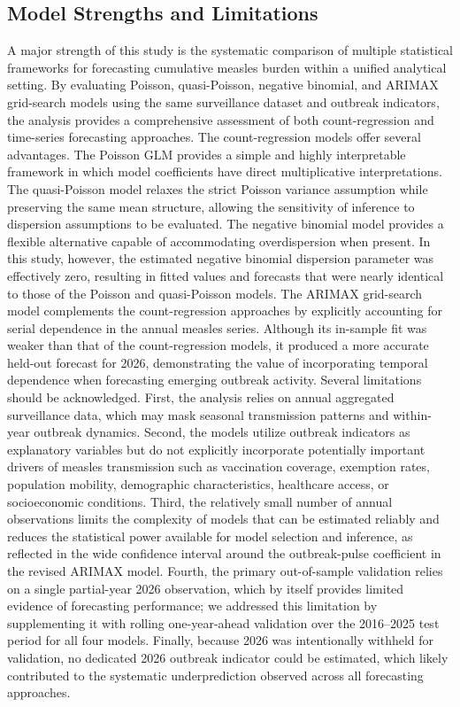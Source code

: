 \documentclass[utf8]{FrontiersinHarvard} %
\begin{document}
\subsection{Model Strengths and Limitations}
A major strength of this study is the systematic comparison of multiple statistical frameworks for forecasting cumulative measles burden within a unified analytical setting. By evaluating Poisson, quasi-Poisson, negative binomial, and ARIMAX grid-search models using the same surveillance dataset and outbreak indicators, the analysis provides a comprehensive assessment of both count-regression and time-series forecasting approaches. The count-regression models offer several advantages. The Poisson GLM provides a simple and highly interpretable framework in which model coefficients have direct multiplicative interpretations. The quasi-Poisson model relaxes the strict Poisson variance assumption while preserving the same mean structure, allowing the sensitivity of inference to dispersion assumptions to be evaluated. The negative binomial model provides a flexible alternative capable of accommodating overdispersion when present. In this study, however, the estimated negative binomial dispersion parameter was effectively zero, resulting in fitted values and forecasts that were nearly identical to those of the Poisson and quasi-Poisson models.
The ARIMAX grid-search model complements the count-regression approaches by explicitly accounting for serial dependence in the annual measles series. Although its in-sample fit was weaker than that of the count-regression models, it produced a more accurate held-out forecast for 2026, demonstrating the value of incorporating temporal dependence when forecasting emerging outbreak activity. Several limitations should be acknowledged. First, the analysis relies on annual aggregated surveillance data, which may mask seasonal transmission patterns and within-year outbreak dynamics. Second, the models utilize outbreak indicators as explanatory variables but do not explicitly incorporate potentially important drivers of measles transmission such as vaccination coverage, exemption rates, population mobility, demographic characteristics, healthcare access, or socioeconomic conditions. Third, the relatively small number of annual observations limits the complexity of models that can be estimated reliably and reduces the statistical power available for model selection and inference, as reflected in the wide confidence interval around the outbreak-pulse coefficient in the revised ARIMAX model. Fourth, the primary out-of-sample validation relies on a single partial-year 2026 observation, which by itself provides limited evidence of forecasting performance; we addressed this limitation by supplementing it with rolling one-year-ahead validation over the 2016--2025 test period for all four models. Finally, because 2026 was intentionally withheld for validation, no dedicated 2026 outbreak indicator could be estimated, which likely contributed to the systematic underprediction observed across all forecasting approaches.
\end{document}

